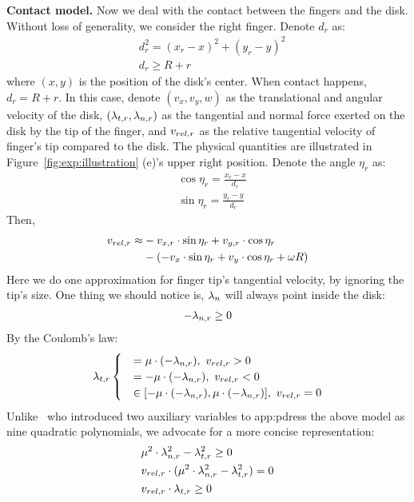 \textbf{Contact model.}
Now we deal with the contact between the fingers and the disk. Without loss of generality, we consider the right finger. Denote $d_r$ as:
\begin{align}
    & d_r^2 = (x_r - x)^2 + (y_r - y)^2 \\
    & d_r \ge R+r
\end{align}
where $(x, y)$ is the position of the disk's center. When contact happens, $d_r = R+r$. In this case, denote $(v_x, v_y, w)$ as the translational and angular velocity of the disk, $(\lam{t}[r], \lam{n}[r])$ as the tangential and normal force exerted on the disk by the tip of the finger, and $\vrelr$ as the relative tangential velocity of finger's tip compared to the disk. The physical quantities are illustrated in Figure~\ref{fig:exp:illustration} (e)'s upper right position. Denote the angle $\eta_r$ as:
\begin{align}
    & \cos\eta_r = \frac{x_r - x}{d_r} \\
    & \sin\eta_r = \frac{y_r - y}{d_r} 
\end{align}
Then,
\begin{align}
    \vrelr \approx & -\vxr \cdot \sin\eta_r + \vyr \cdot \cos\eta_r \nonumber \\
    & - (-v_x \cdot \sin\eta_r + v_y \cdot \cos\eta_r + \omega R)
\end{align}
Here we do one approximation for finger tip's tangential velocity, by ignoring the tip's size. One thing we should notice is, $\lam{n}$ will always point inside the disk:
\begin{align}
    -\lam{n,r} \ge 0 
\end{align}
By the Coulomb's law:
\begin{align}
    \lam{t,r} \begin{cases}
        & = \mu \cdot (-\lam{n,r}), \ \vrelr > 0 \\
        & = -\mu \cdot (-\lam{n,r}), \ \vrelr < 0 \\
        & \in [-\mu \cdot (-\lam{n,r}), \mu \cdot (-\lam{n,r})], \ \vrelr = 0
    \end{cases}
\end{align}
Unlike~\cite{posa2014ijrr-traopt-directmethod-contact} who introduced two auxiliary variables to app:pdress the above model as nine quadratic polynomials, we advocate for a more concise representation:
\begin{align}
    & \mu^2 \cdot \lam{n,r}^2 - \lam{t,r}^2 \ge 0 \\
    & \vrelr \cdot (\mu^2 \cdot \lam{n,r}^2 - \lam{t,r}^2) = 0 \\
    & \vrelr \cdot \lam{t,r} \ge 0 
\end{align}

